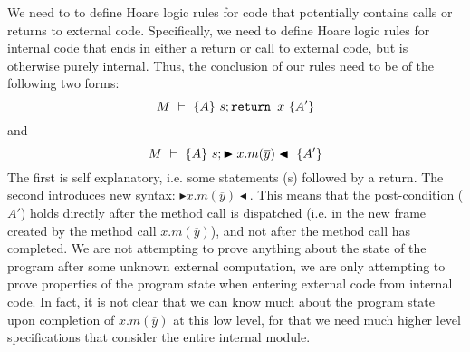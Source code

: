 \documentclass[11pt]{article} %
\theoremstyle{definition}
\begin{document}
We need to to define Hoare logic rules for code that potentially contains calls or returns to external
code. Specifically, we need to define Hoare logic rules for internal code that ends in either a return
or call to external code, but is otherwise purely internal. Thus, the conclusion of our rules need to be of the following two forms:
$$M\ \vdash\ \{A\}\ s; {\texttt{return }} x\ \{A'\}$$ and
$$M\ \vdash\ \{A\}\ s; \blacktriangleright x.m(\overline{y})\blacktriangleleft\ \{A'\}$$
The first is self explanatory, i.e. some statements (s) followed by a return. The second introduces new
syntax: $\blacktriangleright x.m(\overline{y}) \blacktriangleleft$. This means that the post-condition ($A'$)
holds directly after the method call is dispatched (i.e. in the new frame created by the method call $x.m(\overline{y})$), and not after the method call has completed.
We are not attempting to prove anything about the state of the program after some unknown 
external computation, we are only attempting to prove properties of the program state when entering 
external code from internal code. In fact, it is not clear that we can know much about the 
program state upon completion of $x.m(\overline{y})$ at this low level, for that we need much 
higher level \Nec specifications that consider the entire internal module.
\end{document}

